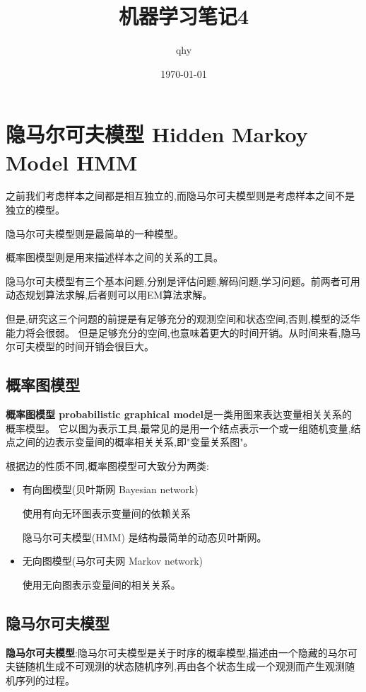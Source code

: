 \documentclass[UTF8,a4paper]{ctexart}%
\author{qhy}%
\title{机器学习笔记4}%
\date{\today}%
\begin{document}
  \maketitle
  \tableofcontents
  \newpage
    \section{隐马尔可夫模型 Hidden Markoy Model HMM}
        {\color{blue}
          之前我们考虑样本之间都是相互独立的,而隐马尔可夫模型则是考虑样本之间不是独立的模型。

          隐马尔可夫模型则是最简单的一种模型。

          概率图模型则是用来描述样本之间的关系的工具。

          隐马尔可夫模型有三个基本问题,分别是评估问题,解码问题,学习问题。前两者可用动态规划算法求解,后者则可以用EM算法求解。

          但是,研究这三个问题的前提是有足够充分的观测空间和状态空间,否则,模型的泛华能力将会很弱。
          但是足够充分的空间,也意味着更大的时间开销。从时间来看,隐马尔可夫模型的时间开销会很巨大。
        }
        \subsection{概率图模型}
            \textbf{概率图模型 probabilistic graphical model}是一类用图来表达变量相关关系的概率模型。
            它以图为表示工具,最常见的是用一个结点表示一个或一组随机变量,结点之间的边表示变量间的概率相关关系,即"变量关系图"。

            根据边的性质不同,概率图模型可大致分为两类:
            \begin{itemize}
              \item 有向图模型(贝叶斯网 Bayesian network)

                  使用有向无环图表示变量间的依赖关系

                  {\color{blue}
                      隐马尔可夫模型(HMM) 是结构最简单的动态贝叶斯网。
                  }

              \item 无向图模型(马尔可夫网 Markov network)

                  使用无向图表示变量间的相关关系。

            \end{itemize}
        \subsection{隐马尔可夫模型}
            \textbf{隐马尔可夫模型}:隐马尔可夫模型是关于时序的概率模型,描述由一个隐藏的马尔可夫链随机生成不可观测的状态随机序列,再由各个状态生成一个观测而产生观测随机序列的过程。
\end{document}
